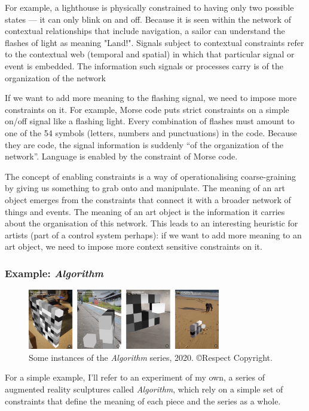 \documentclass[letterpaper]{article}
\begin{document}
    For example, a lighthouse is physically constrained to having only two possible states — it can only blink on and off. Because it is seen within the network of contextual relationships that include navigation, a sailor can understand the flashes of light as meaning "Land!". Signals subject to contextual constraints refer to the contextual web (temporal and spatial) in which that particular signal or event is embedded. The information such signals or processes carry is of the organization of the network \citep[p.237]{JuarreroCsltyAsCnstrnt1998}
    
    If we want to add more meaning to the flashing signal, we need to impose more constraints on it. For example, Morse code puts strict constraints on a simple on/off signal like a flashing light. Every combination of flashes must amount to one of the 54 symbols (letters, numbers and punctuations) in the code. Because they are code, the signal information is suddenly “of the organization of the network”. Language is enabled by the constraint of Morse code.

    The concept of enabling constraints is a way of operationalising coarse-graining by giving us something to grab onto and manipulate. The meaning of an art object emerges from the constraints that connect it with a broader network of things and events. The meaning of an art object is the information it carries about the organisation of this network. This leads to an interesting heuristic for artists (part of a control system perhaps): if we want to add more meaning to an art object, we need to impose more context sensitive constraints on it.

    \subsubsection{Example: \emph{Algorithm}}

    \begin{figure}[h]
    \includegraphics[width=3.31in]{bubble-sort.png}
    \caption{Some instances of the \emph{Algorithm} series, 2020. \copyright Respect Copyright.}
    \end{figure}

    For a simple example, I'll refer to an experiment of my own, a series of augmented reality sculptures called \emph{Algorithm}, which rely on a simple set of constraints that define the meaning of each piece and the series as a whole.
    
\end{document}
